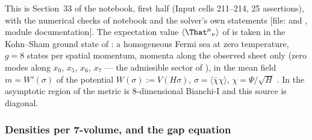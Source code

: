 This is Section~33 of the notebook, first half (Input cells 211--214, 25 assertions), with the
numerical checks of notebook  and the solver's own statements
[file:  and , module
documentation]. The expectation value $\langle\That^\mu{}_\nu\rangle$ of  is taken in the
Kohn--Sham ground state of : a homogeneous Fermi sea at zero temperature, $g=8$ states
per spatial momentum, momenta along the observed sheet only (zero modes along $x_0$, $x_5$, $x_6$, $x_7$
--- the admissible sector of ), in the mean field $m=W'(\sigma)$ of the potential
$W(\sigma):=V(H\sigma)$, $\sigma=\langle\bar\chi\chi\rangle$, $\chi=\Psi/\sqrt H$ . In
the asymptotic region of  the metric is 8-dimensional Bianchi-I and this source is
diagonal.

\subsubsection{Densities per 7-volume, and the gap equation}
\label{sec:4.5.1}

